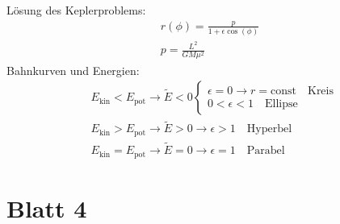 \begin{enumerate}
        Lösung des Keplerproblems:
        \begin{gather}
            r(\phi)=\frac{p}{1 + \epsilon \cos(\phi)} \\
            p=\frac{L^2}{G M \mu^2}
        \end{gather}
        Bahnkurven und Energien:
        \begin{align}
            &E_\text{kin} < E_\text{pot} \to \tilde{E} < 0 
            \begin{cases}
                \epsilon=0 \to r=\text{const} \quad \text{Kreis} \\
                0 < \epsilon < 1 \quad \text{Ellipse}
            \end{cases} \\
            &E_\text{kin} > E_\text{pot} \to \tilde{E} > 0 \to \epsilon > 1 \quad \text{Hyperbel} \\
            &E_\text{kin} = E_\text{pot} \to \tilde{E} = 0  \to \epsilon = 1 \quad \text{Parabel} 
        \end{align}
\end{enumerate}

\newpage

\section*{Blatt 4}

